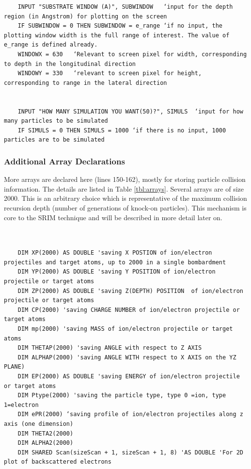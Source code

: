 \documentclass[10pt, reqno]{exam}
\begin{document}
\begin{verbatim}
    INPUT "SUBSTRATE WINDOW (A)", SUBWINDOW   ‘input for the depth region (in Angstrom) for plotting on the screen
    IF SUBWINDOW = 0 THEN SUBWINDOW = e_range ‘if no input, the plotting window width is the full range of interest. The value of e_range is defined already. 
    WINDOWX = 630   ‘Relevant to screen pixel for width, corresponding to depth in the longitudinal direction
    WINDOWY = 330   ‘relevant to screen pixel for height, corresponding to range in the lateral direction
    
    
    INPUT "HOW MANY SIMULATION YOU WANT(50)?", SIMULS  ‘input for how many particles to be simulated
    IF SIMULS = 0 THEN SIMULS = 1000 ‘if there is no input, 1000 particles are to be simulated
\end{verbatim}
\subsubsection{Additional Array Declarations}

More arrays are declared here (lines 150-162), mostly for storing particle collision information. The details are listed in Table \ref{tbl:arrays}. Several arrays are of size 2000. This is an arbitrary choice which is representative of the maximum collision recursion depth (number of generations of knock-on particles). This mechanism is core to the SRIM technique and will be described in more detail later on. \par

\begin{verbatim}

    
    DIM XP(2000) AS DOUBLE 'saving X POSTION of ion/electron projectiles and target atoms, up to 2000 in a single bombardment
    DIM YP(2000) AS DOUBLE 'saving Y POSITION of ion/electron projectile or target atoms
    DIM ZP(2000) AS DOUBLE 'saving Z(DEPTH) POSITION  of ion/electron projectile or target atoms
    DIM CP(2000) 'saving CHARGE NUMBER of ion/electron projectile or target atoms
    DIM mp(2000) 'saving MASS of ion/electron projectile or target atoms
    DIM THETAP(2000) 'saving ANGLE with respect to Z AXIS
    DIM ALPHAP(2000) 'saving ANGLE WITH respect to X AXIS on the YZ PLANE)
    DIM EP(2000) AS DOUBLE 'saving ENERGY of ion/electron projectile or target atoms
    DIM Ptype(2000) 'saving the particle type, type 0 =ion, type 1=electron
    DIM ePR(2000) ‘saving profile of ion/electron projectiles along z axis (one dimension) 
    DIM THETA2(2000)
    DIM ALPHA2(2000)
    DIM SHARED Scan(sizeScan + 1, sizeScan + 1, 8) 'AS DOUBLE 'For 2D plot of backscattered electrons
\end{verbatim}
\end{document}
